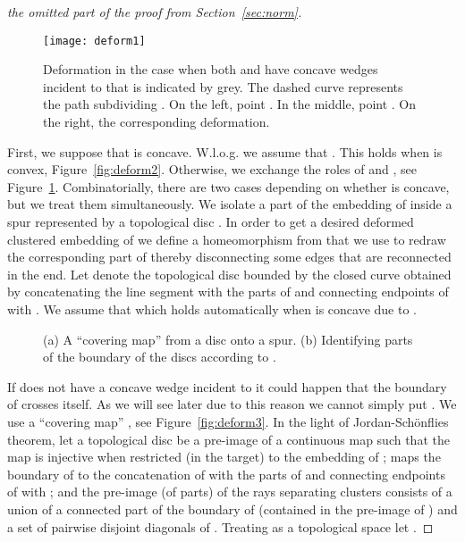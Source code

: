 \documentclass{llncs}
\begin{document}
\begin{proof}[the omitted part of the proof from Section~\ref{sec:norm}]
 \begin{figure}[h]
  \centering
\centering
{
\texttt{[image: deform1]}
    	}

\caption{Deformation in the case when both  and  have concave wedges incident to  that is indicated by grey.
The dashed curve represents the path  subdividing .
On the left,  point . In the middle, 
   point . On the right, the corresponding
 deformation.}
\label{fig:deform1}
\end{figure}


 First, we suppose that  is concave.
 W.l.o.g. we assume that . This holds when  is convex,
 Figure~\ref{fig:deform2}. Otherwise,
we exchange the roles of  and , see Figure~\ref{fig:deform1}. Combinatorially, there are two
cases depending on whether  is concave, but we treat them
simultaneously.
We isolate a part of the embedding of  inside a spur represented
by a topological disc . In order to get a desired deformed clustered embedding of  we define a homeomorphism from  that we use to redraw the corresponding part of   thereby disconnecting some edges
that are reconnected in the end.
 Let  denote the topological disc bounded by the closed curve
obtained by concatenating the line segment  with the parts
of  and  connecting endpoints of   with . 
We assume that  which holds automatically when  is concave due to . 

 
 

 \begin{figure}[h]
  \centering
\centering
{}
    	\hspace{10px}
\caption{(a) A ``covering map''  from a disc onto a spur. (b) Identifying parts of the boundary of the discs  
according to .}

\end{figure}
 

  If  does not have a concave wedge incident to  it could happen that the boundary of  crosses itself. As we will see later due to this reason we cannot simply put .
We use a ``covering map'' , see Figure~\ref{fig:deform3}.
In the light of Jordan-Sch\"onflies theorem,
  let a topological disc  be a pre-image of a continuous  map   such that the map  is injective when restricted (in the target) to the embedding of ;
 maps the boundary of  to the concatenation of 
with the parts of  and  connecting endpoints of   with ;
and the pre-image (of  parts) of the rays separating clusters
 consists of a union of a connected part of the boundary of  
 (contained in the pre-image of ) and
a set of pairwise disjoint diagonals of .
Treating  as a topological space let .  


\end{proof}
\end{document}
